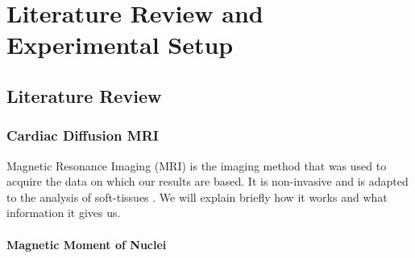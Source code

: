 \chapter{Literature Review and Experimental Setup}

\section{Literature Review}
\subsection{Cardiac Diffusion MRI}

Magnetic Resonance Imaging (MRI) is the imaging method that was used to acquire the data on which our results are based. It is non-invasive and is adapted to the analysis of soft-tissues \cite{bakermans2008}. We will explain briefly how it works and what information it gives us.

\subsubsection{Magnetic Moment of Nuclei}

